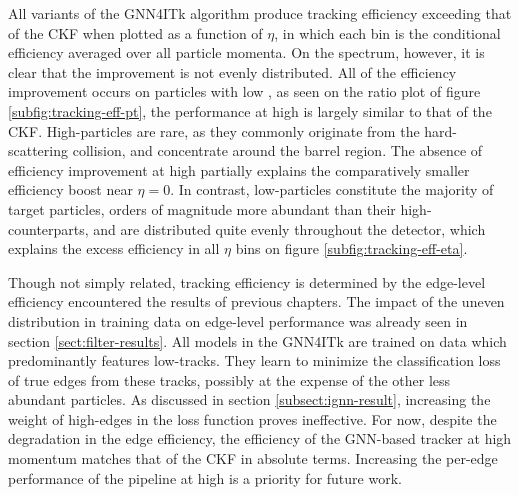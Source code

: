 All variants of the GNN4ITk algorithm produce tracking efficiency exceeding that of the CKF when plotted as a function of $\eta$, in which each bin is the conditional efficiency averaged over all particle momenta. 
On the \pT spectrum, however, it is clear that the improvement is not evenly distributed. 
All of the efficiency improvement occurs on particles with low \pT, as seen on the ratio plot of figure \ref{subfig:tracking-eff-pt}, the performance at high \pT is largely similar to that of the CKF.
High-\pT particles are rare, as they commonly originate from the hard-scattering collision, and concentrate around the barrel region.
The absence of efficiency improvement at high \pT partially explains the comparatively smaller efficiency boost near $\eta=0$. 
In contrast, low-\pT particles constitute the majority of target particles, orders of magnitude more abundant than their high-\pT counterparts, and are distributed quite evenly throughout the detector, which explains the excess efficiency in all $\eta$ bins on figure \ref{subfig:tracking-eff-eta}. 

Though not simply related, tracking efficiency is determined by the edge-level efficiency encountered the results of previous chapters.
The impact of the uneven \pT distribution in training data on edge-level performance was already seen in section \ref{sect:filter-results}. 
All models in the GNN4ITk are trained on data which predominantly features low-\pT tracks. 
They learn to minimize the classification loss of true edges from these tracks, possibly at the expense of the other less abundant particles.
As discussed in section \ref{subsect:ignn-result}, increasing the weight of high-\pT edges in the loss function proves ineffective.
For now, despite the degradation in the edge efficiency, the efficiency of the GNN-based tracker at high momentum matches that of the CKF in absolute terms. 
Increasing the per-edge performance of the pipeline at high \pT is a priority for future work.


